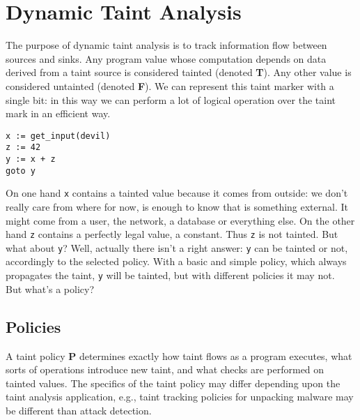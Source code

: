 \section{Dynamic Taint Analysis}
The purpose of dynamic taint analysis is to track information flow between sources and sinks. Any program value whose computation depends on data derived from a taint source is considered tainted (denoted \textbf{T}). Any other value is considered untainted (denoted \textbf{F}). We can represent this taint marker with a single bit: in this way we can perform a lot of logical operation over the taint mark in an efficient way.

\begin{lstlisting}
x := get_input(devil)
z := 42
y := x + z
goto y
\end{lstlisting}

On one hand \texttt{x} contains a tainted value because it comes from outside: we don't really care from where for now, is enough to know that is something external. It might come from a user, the network, a database or everything else. On the other hand \texttt{z} contains a perfectly legal value, a constant. Thus \texttt{z} is not tainted. But what about \texttt{y}? Well, actually there isn't a right answer: \texttt{y} can be tainted or not, accordingly to the selected policy. With a basic and simple policy, which always propagates the taint, \texttt{y} will be tainted, but with different policies it may not. \\

But what's a policy?

\subsection{Policies}
A taint policy \textbf{P} determines exactly how taint flows as a program executes, what sorts of operations introduce new taint, and what checks are performed on tainted values. The specifics of the taint policy may differ depending upon the taint analysis application, e.g., taint tracking policies for unpacking malware may be different than attack detection.

